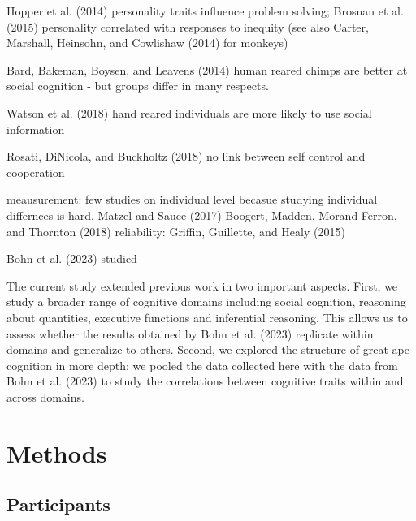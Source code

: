 \documentclass[
  man,floatsintext]{apa6}
\begin{document}
Hopper et al. (2014) personality traits influence problem solving; Brosnan et al. (2015) personality correlated with responses to inequity (see also Carter, Marshall, Heinsohn, and Cowlishaw (2014) for monkeys)

Bard, Bakeman, Boysen, and Leavens (2014) human reared chimps are better at social cognition - but groups differ in many respects.

Watson et al. (2018) hand reared individuals are more likely to use social information

Rosati, DiNicola, and Buckholtz (2018) no link between self control and cooperation

meausurement:
few studies on individual level becasue studying individual differnces is hard. Matzel and Sauce (2017) Boogert, Madden, Morand-Ferron, and Thornton (2018) reliability: Griffin, Guillette, and Healy (2015)

Bohn et al. (2023) studied

The current study extended previous work in two important aspects. First, we study a broader range of cognitive domains including social cognition, reasoning about quantities, executive functions and inferential reasoning. This allows us to assess whether the results obtained by Bohn et al. (2023) replicate within domains and generalize to others. Second, we explored the structure of great ape cognition in more depth: we pooled the data collected here with the data from Bohn et al. (2023) to study the correlations between cognitive traits within and across domains.

\hypertarget{methods}{%
\section{Methods}\label{methods}}

\hypertarget{participants}{%
\subsection{Participants}\label{participants}}
\end{document}
